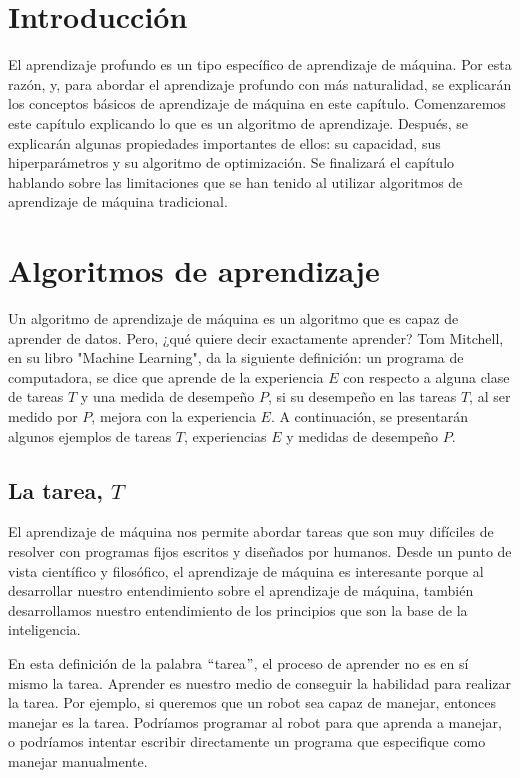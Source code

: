 \section{Introducción}
El aprendizaje profundo es un tipo específico de aprendizaje de máquina. Por esta razón, y, para abordar el aprendizaje profundo con más naturalidad, se explicarán los conceptos básicos de aprendizaje de máquina en este capítulo. Comenzaremos este capítulo explicando lo que es un algoritmo de aprendizaje. Después, se explicarán algunas propiedades importantes de ellos: su capacidad, sus hiperparámetros y su algoritmo de optimización. Se finalizará el capítulo hablando sobre las limitaciones que se han tenido al utilizar algoritmos de aprendizaje de máquina tradicional.

\section{Algoritmos de aprendizaje}
Un algoritmo de aprendizaje de máquina es un algoritmo que es capaz de aprender de datos. Pero, ¿qué quiere decir exactamente aprender? Tom Mitchell, en su libro "Machine Learning", da la siguiente definición: un programa de computadora, se dice que aprende de la experiencia $E$ con respecto a alguna clase de tareas $T$ y una medida de desempeño $P$, si su desempeño en las tareas $T$, al ser medido por $P$, mejora con la experiencia $E$. A continuación, se presentarán algunos ejemplos de tareas $T$, experiencias $E$ y medidas de desempeño $P$. \cite{Mitchell:1997:ML:541177}

\subsection{La tarea, $T$}
El aprendizaje de máquina nos permite abordar tareas que son muy difíciles de resolver con programas fijos escritos y diseñados por humanos. Desde un punto de vista científico y filosófico, el aprendizaje de máquina es interesante porque al desarrollar nuestro entendimiento sobre el aprendizaje de máquina, también desarrollamos nuestro entendimiento de los principios que son la base de la inteligencia. \cite{goodfellow-et-al-2016}

\vspace{1em}

En esta definición de la palabra $``$tarea$"$, el proceso de aprender no es en sí mismo la tarea. Aprender es nuestro medio de conseguir la habilidad para realizar la tarea. Por ejemplo, si queremos que un robot sea capaz de manejar, entonces manejar es la tarea. Podríamos programar al robot para que aprenda a manejar, o podríamos intentar escribir directamente un programa que especifique como manejar manualmente. \cite{goodfellow-et-al-2016} \cite{Mitchell:1997:ML:541177}

